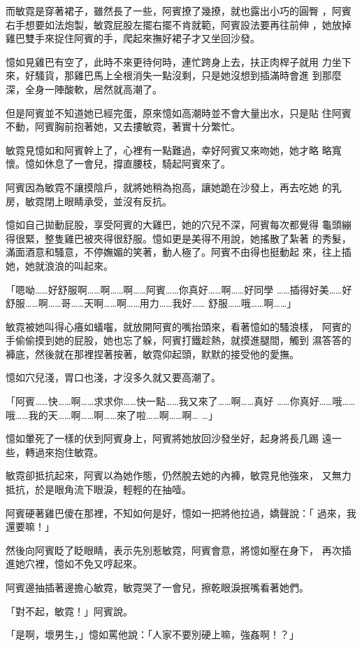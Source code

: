 而敏霓是穿著裙子，雖然長了一些，阿賓撩了幾撩，就也露出小巧的圓臀
，阿賓右手想要如法炮製，敏霓屁股左擺右擺不肯就範，阿賓設法要再往前伸
，她放掉雞巴雙手來捉住阿賓的手，爬起來撫好裙子才又坐回沙發。

憶如見雞巴有空了，此時不來更待何時，連忙跨身上去，扶正肉桿子就用
力坐下來，好騷貨，那雞巴馬上全根消失一點沒剩，只是她沒想到插滿時會進
到那麼深，全身一陣酸軟，居然就高潮了。

但是阿賓並不知道她已經完蛋，原來憶如高潮時並不會大量出水，只是貼
住阿賓不動，阿賓胸前抱著她，又去摟敏霓，著實十分繁忙。

敏霓見憶如和阿賓幹上了，心裡有一點難過，幸好阿賓又來吻她，她才略
略寬懷。憶如休息了一會兒，撐直腰枝，騎起阿賓來了。

阿賓因為敏霓不讓摸陰戶，就將她稍為抱高，讓她跪在沙發上，再去吃她
的乳房，敏霓閉上眼睛承受，並沒有反抗。

憶如自己拋動屁股，享受阿賓的大雞巴，她的穴兒不深，阿賓每次都覺得
龜頭繃得很緊，整隻雞巴被夾得很舒服。憶如更是美得不用說，她搖散了紮著
的秀髮，滿面酒意和騷意，不停嫵媚的笑著，動人極了。阿賓不由得也挺動起
來，往上插她，她就浪浪的叫起來。

「嗯呦……好舒服啊……啊……啊……阿賓……你真好……啊……好同學
……插得好美……好舒服……啊……哥……天啊……啊……用力……我好……
舒服……哦……啊……」

敏霓被她叫得心癢如蟻囓，就放開阿賓的嘴抬頭來，看著憶如的騷浪樣，
阿賓的手偷偷摸到她的屁股，她也忘了躲，阿賓打鐵趁熱，就摸進腿間，觸到
濕答答的褲底，然後就在那裡捏著按著，敏霓仰起頭，默默的接受他的愛撫。

憶如穴兒淺，胃口也淺，才沒多久就又要高潮了。

「阿賓……快……啊……求求你……快一點……我又來了……啊……真好
……你真好……哦……哦……我的天……啊……啊……來了啦……啊……啊…
…」

憶如暈死了一樣的伏到阿賓身上，阿賓將她放回沙發坐好，起身將長几踢
遠一些，轉過來抱住敏霓。

敏霓卻抵抗起來，阿賓以為她作態，仍然脫去她的內褲，敏霓見他強來，
又無力抵抗，於是眼角流下眼淚，輕輕的在抽噎。

阿賓硬著雞巴傻在那裡，不知如何是好，憶如一把將他拉過，嬌聲說：「
過來，我還要嘛！」

然後向阿賓眨了眨眼睛，表示先別惹敏霓，阿賓會意，將憶如壓在身下，
再次插進她穴裡，憶如不免又哼起來。

阿賓邊抽插著邊擔心敏霓，敏霓哭了一會兒，擦乾眼淚抿嘴看著她們。

「對不起，敏霓！」阿賓說。

「是啊，壞男生，」憶如罵他說：「人家不要別硬上嘛，強姦啊！？」

